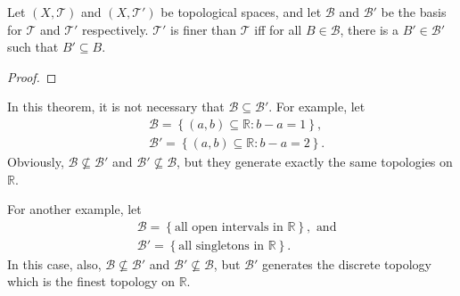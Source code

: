 \begin{theorem}
	Let $(X, \mathcal T)$ and $(X, \mathcal T')$ be topological spaces, and let $\mathcal B$ and $\mathcal B'$ be the basis for $\mathcal T$ and $\mathcal T'$ respectively. $\mathcal T'$ is finer than $\mathcal T$ iff for all $B \in \mathcal B$, there is a $B' \in \mathcal B'$ such that $B' \subseteq B$.
	\begin{proof}
				
	\end{proof}
\end{theorem}





\begin{note}
	In this theorem, it is not necessary that $\mathcal B \subseteq \mathcal B'$. For example, let 
	$$
	\begin{aligned}
		& \mathcal B = \left\{ (a, b) \subseteq \mathbb R : b - a = 1 \right\}, \\
		& \mathcal B' = \left\{ (a, b) \subseteq \mathbb R : b - a = 2 \right\}.
	\end{aligned}
	$$
	Obviously, $\mathcal B \not \subseteq \mathcal B'$ and $\mathcal B' \not \subseteq \mathcal B$, but they generate exactly the same topologies on $\mathbb R$.

	For another example, let
	$$
	\begin{aligned}
		& \mathcal B = \left\{ \text{all open intervals in $\mathbb R$}\right\}, \text{ and} \\
		& \mathcal B' = \left\{ \text{all singletons in $\mathbb R$} \right\}.
	\end{aligned}
	$$
	In this case, also, $\mathcal B \not \subseteq \mathcal B'$ and $\mathcal B' \not \subseteq \mathcal B$, but $\mathcal B'$ generates the discrete topology which is the finest topology on $\mathbb R$.
\end{note}


